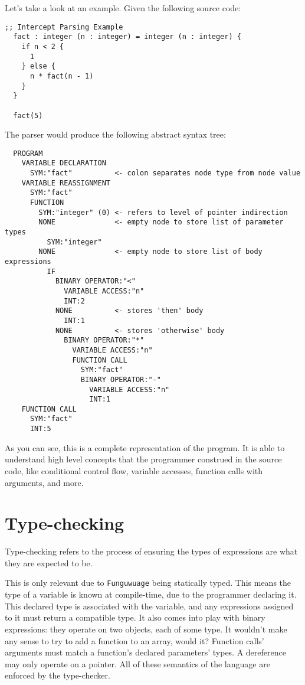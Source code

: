\documentclass[12pt]{report}
\newcommand{\langname}{Funguwuage}
\newcommand{\lang}{\texttt{\langname} }
\begin{document}
\begin{minipage}{\textwidth}

Let's take a look at an example. Given the following source code:
\begin{Verbatim}[samepage=true]
  ;; Intercept Parsing Example
  fact : integer (n : integer) = integer (n : integer) {
    if n < 2 {
      1
    } else {
      n * fact(n - 1)
    }
  }

  fact(5)
\end{Verbatim}

The parser would produce the following abstract syntax tree:
\begin{Verbatim}
  PROGRAM
    VARIABLE DECLARATION
      SYM:"fact"          <- colon separates node type from node value
    VARIABLE REASSIGNMENT
      SYM:"fact"
      FUNCTION
        SYM:"integer" (0) <- refers to level of pointer indirection
        NONE              <- empty node to store list of parameter types
          SYM:"integer"
        NONE              <- empty node to store list of body expressions
          IF
            BINARY OPERATOR:"<"
              VARIABLE ACCESS:"n"
              INT:2
            NONE          <- stores 'then' body
              INT:1
            NONE          <- stores 'otherwise' body
              BINARY OPERATOR:"*"
                VARIABLE ACCESS:"n"
                FUNCTION CALL
                  SYM:"fact"
                  BINARY OPERATOR:"-"
                    VARIABLE ACCESS:"n"
                    INT:1
    FUNCTION CALL
      SYM:"fact"
      INT:5
\end{Verbatim}

As you can see, this is a complete representation of the program. It is able to understand high level concepts that the programmer construed in the source code, like conditional control flow, variable accesses, function calls with arguments, and more.

\end{minipage}


\chapter{Type-checking}
\label{ch:typechecking}

Type-checking refers to the process of ensuring the types of expressions are what they are expected to be.

This is only relevant due to \lang being statically typed. This means the type of a variable is known at compile-time, due to the programmer declaring it. This declared type is associated with the variable, and any expressions assigned to it must return a compatible type. It also comes into play with binary expressions: they operate on two objects, each of some type. It wouldn't make any sense to try to add a function to an array, would it? Function calls' arguments must match a function's declared parameters' types. A dereference may only operate on a pointer. All of these semantics of the language are enforced by the type-checker.
\end{document}
